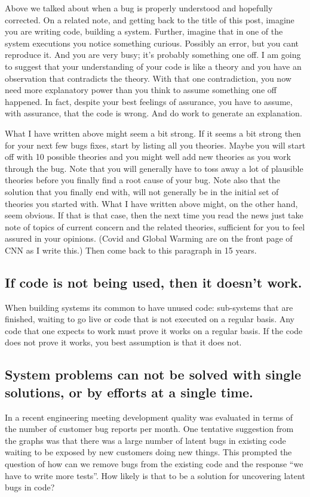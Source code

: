 Above we talked about when a bug is properly understood and hopefully corrected. On a related note, and getting back to the title of this post, imagine you are writing
code, building a system. Further, imagine that in one of the system executions you notice something curious. Possibly an error, but you cant reproduce it. And you are very busy;
it's probably something one off. I am going to suggest that your understanding of your code is like a theory and you have an observation that contradicts the
theory. With that one contradiction, you now need more explanatory power than you think to assume something one off happened. In fact, despite your
best feelings of assurance, you have to assume, with assurance, that the code is wrong. And do work to generate an explanation.

What I have written above might seem a bit strong. If it seems a bit strong then for your next few bugs fixes, start by listing all you theories. Maybe
you will start off with 10 possible theories and you might well add new theories as you work through the bug. Note that you will generally have to toss
away a lot of plausible theories before you finally find a root cause of your bug. Note also that the solution that you finally end with, will not generally be
in the initial set of theories you started with. What I have written above might, on the other hand, seem obvious. If that is that case, then the next time
you read the news just take note of topics of current concern and the related theories, sufficient for you to feel assured in your opinions. (Covid and Global
Warming are on the front page of CNN as I write this.) Then come back to this paragraph in 15 years.

\subsection{If code is not being used, then it doesn't work.}
When building systems its common to have unused code: sub-systems that are finished, waiting to go live or code that is not
executed on a regular basis. Any code that one expects to work must prove it works on a regular basis. If the code does not prove it works, you best assumption
is that it does not.

\subsection{System problems can not be solved with single solutions, or by efforts at a single time.}
In a recent engineering meeting development quality was evaluated in terms of the number of customer bug reports per month.
One tentative suggestion from the graphs was that there was a large number of latent bugs in existing code waiting to be exposed by
new customers doing new things. This prompted the question of how can we remove bugs from the existing code and the response
``we have to write more tests''. How likely is that to be a solution for uncovering latent bugs in code?

